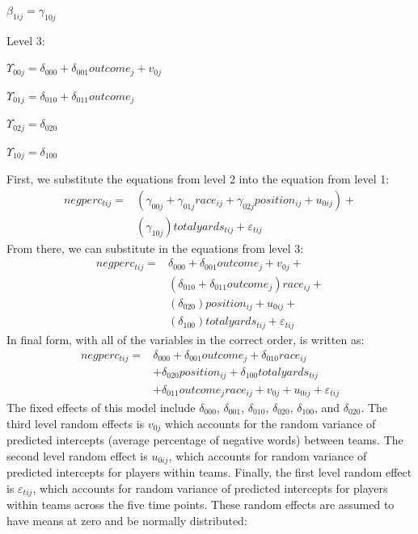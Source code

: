 \documentclass[12pt,twoside]{reedthesis}
\begin{document}
\(\beta_{1ij} = \gamma_{10j}\)

Level 3: \(~\)

\(\Upsilon_{00j} = \delta_{000} + \delta_{001}outcome_{j} + v_{0j}\)

\(\Upsilon_{01j} = \delta_{010} + \delta_{011}outcome_{j}\)

\(\Upsilon_{02j} = \delta_{020}\)

\(\Upsilon_{10j} = \delta_{100}\)

First, we substitute the equations from level 2 into the equation from
level 1: \(~\)
\begin{align*}
negperc_{tij} = &(\gamma_{00j} + \gamma_{01j}race_{ij} + \gamma_{02j}position_{ij} + u_{0ij}) +\\
&(\gamma_{10j})totalyards_{tij} + \varepsilon_{tij}
\end{align*}
From there, we can substitute in the equations from level 3: \(~\)
\begin{align*}
negperc_{tij} = &\delta_{000} + \delta_{001}outcome_{j} + v_{0j} + \\
&(\delta_{010} + \delta_{011}outcome_{j})race_{ij} + \\
&(\delta_{020})position_{ij} + u_{0ij} +\\
&(\delta_{100})totalyards_{tij} + \varepsilon_{tij}
\end{align*}
In final form, with all of the variables in the correct order, is
written as: \(~\)
\begin{align*}
negperc_{tij} = &\delta_{000} + \delta_{001}outcome_{j} + \delta_{010}race_{ij} \\
&+ \delta_{020}position_{ij} + \delta_{100}totalyards_{tij}\\
&+\delta_{011}outcome_{j}race_{ij} + v_{0j} + u_{0ij} + \varepsilon_{tij}
\end{align*}
The fixed effects of this model include \(\delta_{000}\),
\(\delta_{001}\), \(\delta_{010}\), \(\delta_{020}\), \(\delta_{100}\),
and \(\delta_{020}\). The third level random effects is \(v_{0j}\) which
accounts for the random variance of predicted intercepts (average
percentage of negative words) between teams. The second level random
effect is \(u_{0ij}\), which accounts for random variance of predicted
intercepts for players within teams. Finally, the first level random
effect is \(\varepsilon_{tij}\), which accounts for random variance of
predicted intercepts for players within teams across the five time
points. These random effects are assumed to have means at zero and be
normally distributed:
\end{document}
